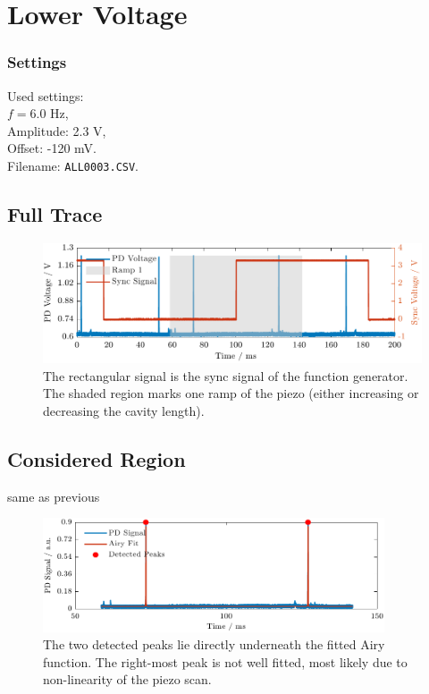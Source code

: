 \documentclass[a4paper,11pt]{article}
\begin{document}
\newpage
\section{Lower Voltage}
\subsubsection*{Settings}
Used settings:  \\
$f = 6.0$ Hz,  \\
Amplitude: 2.3 V,  \\
Offset: -120 mV.  \\
Filename: \texttt{ALL0003.CSV}.  

\subsection{Full Trace}

\begin{figure}[H]
    \centering
    \includegraphics[width=\textwidth]{Figure_1_low.pdf}
    \caption{The rectangular signal is the sync signal of the function generator. The shaded region marks one ramp of the piezo (either increasing or decreasing the cavity length).}
    \label{fig:full_low}
\end{figure}

\subsection{Considered Region}
same as previous
\begin{figure}[H]
    \centering
    \includegraphics[width=0.9\textwidth]{Figure_2_low.pdf}
    \caption{The two detected peaks lie directly underneath the fitted Airy function. The right-most peak is not well fitted, most likely due to non-linearity of the piezo scan.}
    \label{fig:fit_low}
\end{figure}
\end{document}
